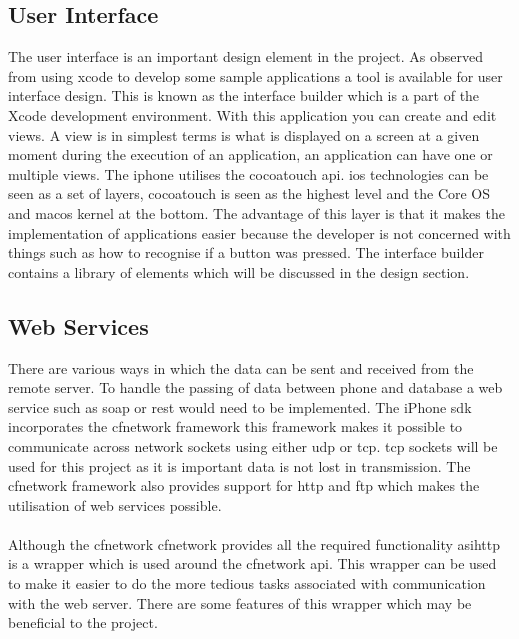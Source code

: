 \documentclass[12pt]{article}
\begin{document}
\subsection{User Interface}

The user interface is an important design element in the project. As observed from using \gls{xcode} to develop some sample applications a tool is available for user interface design. This is known as the interface builder which is a part of the Xcode development environment. With this application you can create and edit views. A view is in simplest terms is what is displayed on a screen at a given moment during the execution of an application, an application can have one or multiple views. The \gls{iphone} utilises the \gls{cocoatouch} \gls{api}. \gls{ios} technologies can be seen as a set of layers, \gls{cocoatouch} is seen as the highest level and the Core OS and \gls{macos} kernel at the bottom. The advantage of this layer is that it makes the implementation of applications easier because the developer is not concerned with things such as how to recognise if a button was pressed. The interface builder contains a library of elements which will be discussed in the design section.

\subsection{Web Services}

There are various ways in which the data can be sent and received from the remote server. To handle the passing of data between phone and database a web service such as \gls{soap} or \gls{rest} would need to be implemented. The iPhone \gls{sdk} incorporates the \gls{cfnetwork} framework this framework makes it possible to communicate across network sockets using either \gls{udp} or \gls{tcp}.  \gls{tcp} sockets will be used for this project as it is important data is not lost in transmission. The \gls{cfnetwork} framework also provides support for \gls{http} and \gls{ftp} which makes the utilisation of web services possible.

\paragraph{}

Although the \gls{cfnetwork} \gls{cfnetwork} provides all the required functionality \gls{asihttp} is a wrapper which is used around the \gls{cfnetwork} \gls{api}. This wrapper can be used to make it easier to do the more tedious tasks associated with communication with the web server. There are some features of this wrapper which may be beneficial to the project.
\end{document}
